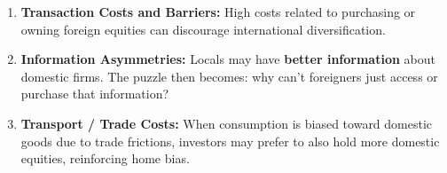 \documentclass[12pt]{article}
\begin{document}

\begin{enumerate}
    \item \textbf{Transaction Costs and Barriers:} High costs related to purchasing or owning foreign equities can discourage international diversification.

    \item \textbf{Information Asymmetries:} Locals may have \textbf{better information} about domestic firms. The puzzle then becomes: why can’t foreigners just access or purchase that information?

    \item \textbf{Transport / Trade Costs:} When consumption is biased toward domestic goods due to trade frictions, investors may prefer to also hold more domestic equities, reinforcing home bias.
\end{enumerate}
\end{document}
